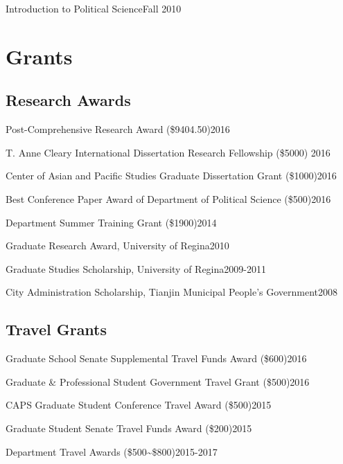 \documentclass[10.5pt,]{article}
\providecommand{\tightlist}{%
	\setlength{\itemsep}{0pt}\setlength{\parskip}{0pt}}
\renewenvironment{itemize}{
	\begin{list}{}{
			\setlength{\leftmargin}{1.5em}
		}
	}{
	\end{list}
}
\begin{document}
\begin{itemize}
\tightlist
\item
  Introduction to Political Science\hfill Fall 2010
\end{itemize}

\section{Grants}\label{grants}

\subsection{Research Awards}\label{research-awards}

\begin{itemize}
\tightlist
\item
  Post-Comprehensive Research Award (\$9404.50)\hfill 2016
\item
  T. Anne Cleary International Dissertation Research Fellowship (\$5000)
  \hfill 2016
\item
  Center of Asian and Pacific Studies Graduate Dissertation Grant
  (\$1000)\hfill 2016
\item
  Best Conference Paper Award of Department of Political Science
  (\$500)\hfill 2016
\item
  Department Summer Training Grant (\$1900)\hfill 2014
\item
  Graduate Research Award, University of Regina\hfill 2010
\item
  Graduate Studies Scholarship, University of Regina\hfill 2009-2011
\item
  City Administration Scholarship, Tianjin Municipal People's
  Government\hfill 2008
\end{itemize}

\subsection{Travel Grants}\label{travel-grants}

\begin{itemize}
\tightlist
\item
  Graduate School Senate Supplemental Travel Funds Award
  (\$600)\hfill 2016
\item
  Graduate \& Professional Student Government Travel Grant
  (\$500)\hfill 2016
\item
  CAPS Graduate Student Conference Travel Award (\$500)\hfill 2015
\item
  Graduate Student Senate Travel Funds Award (\$200)\hfill 2015
\item
  Department Travel Awards (\$500\textasciitilde{}\$800)\hfill 2015-2017
\end{itemize}
\end{document}
